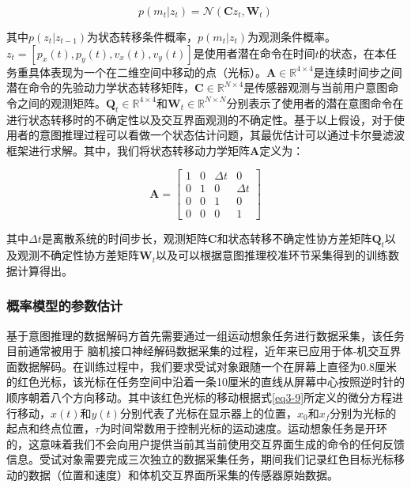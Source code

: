 \begin{equation}
\label{eq5}
p({m_t}|{z_t}) = \mathcal{N}({\boldsymbol{C}}{z_t},{{\boldsymbol{W}}_t})
\end{equation}    

其中$p({z_t}|{z_{t - 1}})$为状态转移条件概率，$p({m_t}|{z_t})$为观测条件概率。${z_t} = [{p_x}(t),{p_y}(t),{v_x}(t),{v_y}(t)]$是使用者潜在命令在时间$t$的状态，在本任务重具体表现为一个在二维空间中移动的点（光标）。${\boldsymbol{A}} \in {\mathbb{R}^{4 \times 4}}$是连续时间步之间潜在命令的先验动力学状态转移矩阵，${\boldsymbol{C}} \in {\mathbb{R}^{N \times 4}}$是传感器观测与当前用户意图命令之间的观测矩阵。${{\boldsymbol{Q}}_t} \in {\mathbb{R}^{4 \times 4}}$和${{\boldsymbol{W}}_t} \in {\mathbb{R}^{N \times N}}$分别表示了使用者的潜在意图命令在进行状态转移时的不确定性以及交互界面观测的不确定性。基于以上假设，对于使用者的意图推理过程可以看做一个状态估计问题，其最优估计可以通过卡尔曼滤波框架进行求解。其中，我们将状态转移动力学矩阵${\boldsymbol{A}}$定义为：

\begin{equation}
\boldsymbol{A} = 
\begin{bmatrix}{}
1&0&{\Delta t}&0  \\  
0&1&0&{\Delta t}  \\  
0&0&1&0  \\  
0&0&0&1 
\end{bmatrix}
\end{equation} 

其中$\Delta t$是离散系统的时间步长，观测矩阵${\boldsymbol{C}}$和状态转移不确定性协方差矩阵${{\boldsymbol{Q}}_t}$以及观测不确定性协方差矩阵${{\boldsymbol{W}}_t}$以及可以根据意图推理校准环节采集得到的训练数据计算得出。


\subsubsection{概率模型的参数估计}基于意图推理的数据解码方首先需要通过一组运动想象任务进行数据采集，该任务目前通常被用于 脑机接口神经解码数据采集的过程\cite{malikEfficientDecodingSteadyState2011,brandmanRapidCalibrationIntracortical2018a}，近年来已应用于体-机交互界面数据解码\cite{seanez-gonzalezCursorControlKalman2014,seanez-gonzalezStaticDynamicDecoding2017}。在训练过程中，我们要求受试对象跟随一个在屏幕上直径为0.8厘米的红色光标，该光标在任务空间中沿着一条10厘米的直线从屏幕中心按照逆时针的顺序朝着八个方向移动。其中该红色光标的移动根据式\ref{eq3-9}所定义的微分方程进行移动\cite{seanez-gonzalezStaticDynamicDecoding2017}，$x(t)$和$y(t)$分别代表了光标在显示器上的位置，$x_0$和$x_f$分别为光标的起点和终点位置，$\tau$为时间常数用于控制光标的运动速度。运动想象任务是开环的，这意味着我们不会向用户提供当前其当前使用交互界面生成的命令的任何反馈信息。受试对象需要完成三次独立的数据采集任务，期间我们记录红色目标光标移动的数据（位置和速度）和体机交互界面所采集的传感器原始数据。

